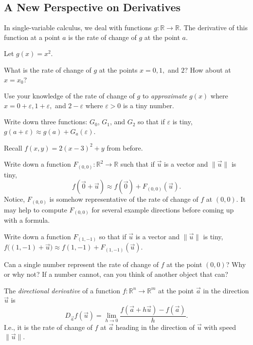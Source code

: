 \documentclass{problemset}
\newcommand{\R}{\mathbb{R}}
\begin{document}
\subsection*{A New Perspective on Derivatives}

	In single-variable calculus, we deal with functions $g:\R\to\R$.  The derivative of this function
	at a point $a$ is the rate of change of $g$ at the point $a$.

	\question
	Let $g(x)=x^2$.
	\begin{parts}
		\item What is the rate of change of $g$ at the points $x=0,1,$ and $2$?  How about at $x=x_0$?
		\item Use your knowledge of the rate of change of $g$ to \emph{approximate} $g(x)$ where
			$x=0+\varepsilon, 1+\varepsilon,$ and $2-\varepsilon$ where $\varepsilon>0$ is a tiny number.
		\item Write down three functions: $G_0$, $G_1$, and $G_2$ so that if $\varepsilon$ is tiny, $g(a+\varepsilon)\approx
			g(a) + G_a(\varepsilon)$.  
	\end{parts}

	\question
	Recall $f(x,y)=2(x-3)^2+y$ from before.
	\begin{parts}
		\item Write down a function $F_{(0,0)}:\R^2\to\R$ such that if $\vec u$ is a vector
			and $\|\vec u\|$ is tiny, 
			\[
				f(\vec 0+\vec u)\approx f(\vec 0) + F_{(0,0)}(\vec u).
			\]
			Notice, $F_{(0,0)}$ is somehow representative of the rate of change of $f$ at $(0,0)$.
			It may help to compute $F_{(0,0)}$ for several example directions before coming up
			with a formula.
		\item Write down a function $F_{(1,-1)}$ so that if $\vec u$ is a vector and $\|\vec u\|$ is
			tiny, $f\Big((1,-1)+\vec u\Big)\approx f(1,-1)+F_{(1,-1)}(\vec u)$.
		\item Can a single number represent the rate of change of $f$ at the point $(0,0)$?  Why or why not?
			If a number cannot, can you think of another object that can?
	\end{parts}

\newpage

	\begin{definition}
		The \emph{directional derivative} of a function $f:\R^n\to\R^m$ at the
		point $\vec a$ in the direction $\vec u$ is
		\[
			D_{\vec a}f(\vec u) = \lim_{h\to 0} \frac{f(\vec a+h\vec u)-f(\vec a)}{h}.
		\]
		I.e., it is the rate of change of $f$ at $\vec a$ heading in the direction of $\vec u$
		with speed $\|\vec u\|$.
	\end{definition}
\end{document}
